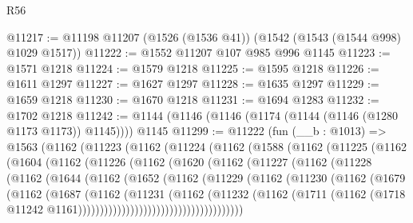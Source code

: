 \begin{lexlean}{R56}
\begin{coremodule}
@11217 := @11198 @11207 (@1526 (@1536 @41)) (@1542 (@1543 (@1544 @998) @1029 @1517))
@11222 := @1552 @11207 @107 @985 @996 @1145
@11223 := @1571 @1218
@11224 := @1579 @1218
@11225 := @1595 @1218
@11226 := @1611 @1297
@11227 := @1627 @1297
@11228 := @1635 @1297
@11229 := @1659 @1218
@11230 := @1670 @1218
@11231 := @1694 @1283
@11232 := @1702 @1218
@11242 := @1144 (@1146 (@1146 (@1174 (@1144 (@1146 (@1280 @1173 @1173)) @1145)))) @1145
@11299 := @11222
    (fun (__b : @1013) =>
    @1563
      (@1162
        (@11223
          (@1162
            (@11224
              (@1162
                (@1588
                  (@1162
                    (@11225
                      (@1162
                        (@1604
                          (@1162
                            (@11226
                              (@1162
                                (@1620
                                  (@1162
                                    (@11227
                                      (@1162
                                        (@11228
                                          (@1162
                                            (@1644
                                              (@1162
                                                (@1652
                                                  (@1162
                                                    (@11229
                                                      (@1162
                                                        (@11230
                                                          (@1162
                                                            (@1679
                                                              (@1162
                                                                (@1687
                                                                  (@1162
                                                                    (@11231
                                                                      (@1162
                                                                        (@11232
                                                                          (@1162
                                                                            (@1711
                                                                              (@1162
                                                                                (@1718
                                                                                  @11242
                                                                                  @1161))))))))))))))))))))))))))))))))))))))

\end{coremodule}
\end{lexlean}
